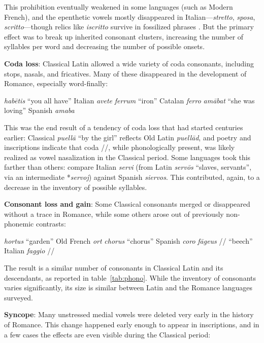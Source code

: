 \documentclass[12pt,twoside]{article}
\newcommand{\ipa}[1]{/\textipa{#1}/}
\newcommand{\yields}{\textrightarrow}
\begin{document}
This prohibition eventually weakened in some languages (such as Modern French), and the epenthetic vowels mostly disappeared in Italian---\emph{stretto}, \emph{sposa}, \emph{scritto}---though relics like \emph{iscritto} survive in fossilized phrases \citep{alkire}. But the primary effect was to break up inherited consonant clusters, increasing the number of syllables per word and decreasing the number of possible onsets.

\textbf{Coda loss}: Classical Latin allowed a wide variety of coda consonants, including stops, nasals, and fricatives. Many of these disappeared in the development of Romance, especially word-finally:

\begin{exe}
\ex \emph{hab\=etis} ``you all have'' \yields{} Italian \emph{avete}
\ex \emph{ferrum} ``iron'' \yields{} Catalan \emph{ferro}
\ex \emph{am\=abat} ``she was loving'' \yields{} Spanish \emph{amaba}
\end{exe}

This was the end result of a tendency of coda loss that had started centuries earlier: Classical \emph{puell\=a} ``by the girl'' reflects Old Latin \emph{puell\=ad}, and poetry and inscriptions indicate that coda \ipa{m}, while phonologically present, was likely realized as vowel nasalization in the Classical period. Some languages took this farther than others: compare Italian \emph{servi} (from Latin \emph{serv\=os} ``slaves, servants'', via an intermediate *\emph{servoj}) against Spanish \emph{siervos}. This contributed, again, to a decrease in the inventory of possible syllables.

\textbf{Consonant loss and gain}: Some Classical consonants merged or disappeared without a trace in Romance, while some others arose out of previously non-phonemic contrasts:

\begin{exe}
\ex \emph{hortus} ``garden'' \yields{} Old French \emph{ort}
\ex \emph{chorus} ``chorus'' \yields{} Spanish \emph{coro}
\ex \emph{f\=ageus} \ipa{fa:geus} ``beech'' \yields{} Italian \emph{faggio} \ipa{faddZo}
\end{exe}

The result is a similar number of consonants in Classical Latin and its descendants, as reported in table~\ref{tab:phono}. While the inventory of consonants varies significantly, its size is similar between Latin and the Romance languages surveyed.

\textbf{Syncope}: Many unstressed medial vowels were deleted very early in the history of Romance. This change happened early enough to appear in inscriptions, and in a few cases the effects are even visible during the Classical period:
\end{document}
